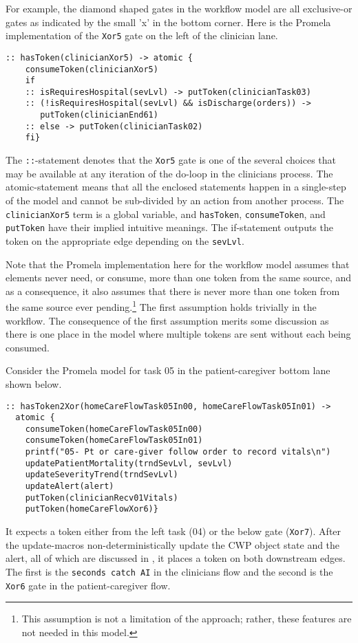For example, the diamond shaped gates in the workflow model are all exclusive-or gates as indicated by the small 'x' in the bottom corner. Here is the Promela implementation of the \texttt{Xor5} gate on the left of the clinician lane.
%
{\small
\begin{lstlisting}[style=myPromela]
:: hasToken(clinicianXor5) -> atomic { 
    consumeToken(clinicianXor5)
    if
    :: isRequiresHospital(sevLvl) -> putToken(clinicianTask03)
    :: (!isRequiresHospital(sevLvl) && isDischarge(orders)) -> 
       putToken(clinicianEnd61)
    :: else -> putToken(clinicianTask02)
    fi}
\end{lstlisting}
}
% 
\noindent The \texttt{::}-statement denotes that the \texttt{Xor5} gate is one of the several choices that may be available at any iteration of the do-loop in the clinicians process. The atomic-statement means that all the enclosed statements happen in a single-step of the model and cannot be sub-divided by an action from another process.
The \texttt{clinicianXor5} term is a global variable, and \texttt{hasToken}, \texttt{consumeToken}, and \texttt{putToken} have their implied intuitive meanings. The if-statement outputs the token on the appropriate edge depending on the \texttt{sevLvl}. 

Note that the Promela implementation here for the workflow model assumes that elements never need, or consume, more than one token from the same source, and as a consequence, it also assumes that there is never more than one token from the same source ever pending.\footnote{This assumption is not a limitation of the approach; rather, these features are not needed in this model.} The first assumption holds trivially in the workflow. The consequence of the first assumption merits some discussion as there is one place in the model where multiple tokens are sent without each being consumed.

Consider the Promela model for task 05 in the patient-caregiver bottom lane shown below.
%
{\small
\begin{lstlisting}[style=myPromela]
:: hasToken2Xor(homeCareFlowTask05In00, homeCareFlowTask05In01) -> 
  atomic {
    consumeToken(homeCareFlowTask05In00)
    consumeToken(homeCareFlowTask05In01)
    printf("05- Pt or care-giver follow order to record vitals\n")
    updatePatientMortality(trndSevLvl, sevLvl)
    updateSeverityTrend(trndSevLvl)
    updateAlert(alert)
    putToken(clinicianRecv01Vitals)
    putToken(homeCareFlowXor6)}
\end{lstlisting}
}
%
\noindent It expects a token either from the left task (04) or the below gate (\texttt{Xor7}). After the update-macros non-deterministically update the CWP object state and the alert, all of which are discussed in , it places a token on both downstream edges. The first is the \texttt{seconds catch AI} in the clinicians flow and the second is the \texttt{Xor6} gate in the patient-caregiver flow. 

